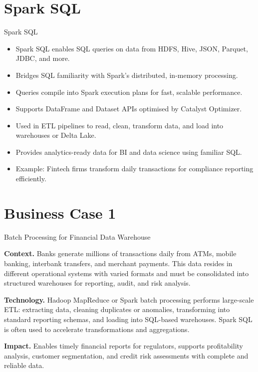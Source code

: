 \documentclass[aspectratio=169, table]{beamer}
\begin{document}
\section{Spark SQL}
\begin{frame}{Spark SQL}
	\vspace{20pt}
	
	\begin{itemize}
		\item Spark SQL enables SQL queries on data from HDFS, Hive, JSON, Parquet, JDBC, and more.
		
		\item Bridges SQL familiarity with Spark’s distributed, in-memory processing.
		
		\item Queries compile into Spark execution plans for fast, scalable performance.
		
		\item Supports DataFrame and Dataset APIs optimised by Catalyst Optimizer.
		
		\item Used in ETL pipelines to read, clean, transform data, and load into warehouses or Delta Lake.
		
		\item Provides analytics-ready data for BI and data science using familiar SQL.
		
		\item Example: Fintech firms transform daily transactions for compliance reporting efficiently.
	\end{itemize}
	
\end{frame}

\section{Business Case 1}
\begin{frame}{\LARGE{Batch Processing for Financial Data Warehouse}}
	\vspace{20pt}
	
	\textbf{Context.} Banks generate millions of transactions daily from ATMs, mobile banking, interbank transfers, and merchant payments. This data resides in different operational systems with varied formats and must be consolidated into structured warehouses for reporting, audit, and risk analysis.
	
	\vspace{10pt}
	\textbf{Technology.} Hadoop MapReduce or Spark batch processing performs large-scale ETL: extracting data, cleaning duplicates or anomalies, transforming into standard reporting schemas, and loading into SQL-based warehouses. Spark SQL is often used to accelerate transformations and aggregations.
	
	\vspace{10pt}
	\textbf{Impact.} Enables timely financial reports for regulators, supports profitability analysis, customer segmentation, and credit risk assessments with complete and reliable data.
	
\end{frame}
\end{document}
